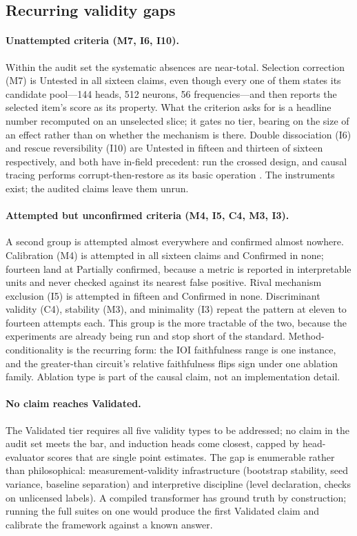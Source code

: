 \documentclass{article}
\begin{document}
\subsection{Recurring validity gaps}
\label{sec:gaps}

\paragraph{Unattempted criteria (M7, I6, I10).} Within the audit set the systematic absences are near-total. Selection correction (M7) is Untested in all sixteen claims, even though every one of them states its candidate pool---144 heads, 512 neurons, 56 frequencies---and then reports the selected item's score as its property. What the criterion asks for is a headline number recomputed on an unselected slice; it gates no tier, bearing on the size of an effect rather than on whether the mechanism is there. Double dissociation (I6) and rescue reversibility (I10) are Untested in fifteen and thirteen of sixteen respectively, and both have in-field precedent: \citet{feucht2025dual} run the crossed design, and causal tracing performs corrupt-then-restore as its basic operation \citep{meng2022locating}. The instruments exist; the audited claims leave them unrun.

\paragraph{Attempted but unconfirmed criteria (M4, I5, C4, M3, I3).} A second group is attempted almost everywhere and confirmed almost nowhere. Calibration (M4) is attempted in all sixteen claims and Confirmed in none; fourteen land at Partially confirmed, because a metric is reported in interpretable units and never checked against its nearest false positive. Rival mechanism exclusion (I5) is attempted in fifteen and Confirmed in none. Discriminant validity (C4), stability (M3), and minimality (I3) repeat the pattern at eleven to fourteen attempts each. This group is the more tractable of the two, because the experiments are already being run and stop short of the standard. Method-conditionality is the recurring form: the IOI faithfulness range is one instance, and the greater-than circuit's relative faithfulness flips sign under one ablation family. Ablation type is part of the causal claim, not an implementation detail.

\paragraph{No claim reaches Validated.} The Validated tier requires all five validity types to be addressed; no claim in the audit set meets the bar, and induction heads come closest, capped by head-evaluator scores that are single point estimates. The gap is enumerable rather than philosophical: measurement-validity infrastructure (bootstrap stability, seed variance, baseline separation) and interpretive discipline (level declaration, checks on unlicensed labels). A compiled transformer \citep{lindner2023interp} has ground truth by construction; running the full suites on one would produce the first Validated claim and calibrate the framework against a known answer.
\end{document}
